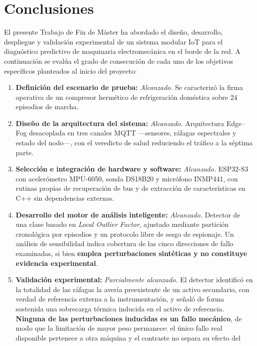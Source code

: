 \section{Conclusiones}

El presente Trabajo de Fin de Máster ha abordado el diseño, desarrollo, despliegue y validación
experimental de un sistema modular IoT para el diagnóstico predictivo de maquinaria
electromecánica en el borde de la red. A continuación se evalúa el grado de consecución de cada
uno de los objetivos específicos planteados al inicio del proyecto:

\begin{enumerate}
    \item \textbf{Definición del escenario de prueba:} \textit{Alcanzado.} Se caracterizó la firma
        operativa de un compresor hermético de refrigeración doméstica sobre 24 episodios de marcha.
    \item \textbf{Diseño de la arquitectura del sistema:} \textit{Alcanzado.} Arquitectura
        Edge--Fog desacoplada en tres canales MQTT —sensores, ráfagas espectrales y estado del
        nodo—, con el veredicto de salud reduciendo el tráfico a la séptima parte.
    \item \textbf{Selección e integración de hardware y software:} \textit{Alcanzado.} ESP32-S3 con
        acelerómetro MPU-6050, sonda DS18B20 y micrófono INMP441, con rutinas propias de
        recuperación de bus y de extracción de características en C++ sin dependencias externas.
    \item \textbf{Desarrollo del motor de análisis inteligente:} \textit{Alcanzado.} Detector de
        una clase basado en \textit{Local Outlier Factor}, ajustado mediante partición cronológica
        por episodios y un protocolo libre de sesgo de espionaje. Un análisis de sensibilidad
        indica cobertura de las cinco direcciones de fallo examinadas, si bien \textbf{emplea
        perturbaciones sintéticas y no constituye evidencia experimental}.
    \item \textbf{Validación experimental:} \textit{Parcialmente alcanzado.} El detector identificó
        en la totalidad de las ráfagas la avería preexistente de un activo secundario, con verdad
        de referencia externa a la instrumentación, y señaló de forma sostenida una sobrecarga
        térmica inducida en el activo de referencia. \textbf{Ninguna de las perturbaciones
        inducidas es un fallo mecánico}, de modo que la limitación de mayor peso permanece: el
        único fallo real disponible pertenece a otra máquina y el contraste no separa su efecto del

\end{enumerate}
